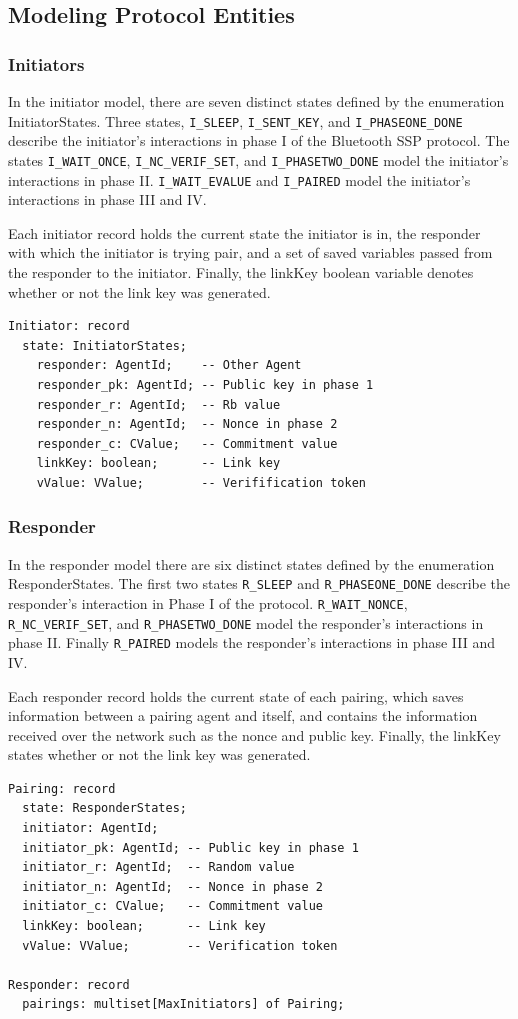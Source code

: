 \documentclass{acm_proc_article-sp}
\begin{document}
\subsection{Modeling Protocol Entities}

\subsubsection{Initiators}
In the initiator model, there are seven distinct states defined by the enumeration InitiatorStates. Three states, \texttt{I\_SLEEP}, \texttt{I\_SENT\_KEY}, and \texttt{I\_PHASEONE\_DONE} describe the initiator's interactions in phase I of the Bluetooth SSP protocol. The states \texttt{I\_WAIT\_ONCE}, \texttt{I\_NC\_VERIF\_SET}, and \texttt{I\_PHASETWO\_DONE} model the initiator's interactions in phase II. \texttt{I\_WAIT\_EVALUE} and \texttt{I\_PAIRED} model the initiator's interactions in phase III and IV.

Each initiator record holds the current state the initiator is in, the responder with which the initiator is trying pair, and a set of saved variables passed from the responder to the initiator. Finally, the linkKey boolean variable denotes whether or not the link key was generated.
\begin{verbatim}
Initiator: record
  state: InitiatorStates;
    responder: AgentId;    -- Other Agent
    responder_pk: AgentId; -- Public key in phase 1
    responder_r: AgentId;  -- Rb value
    responder_n: AgentId;  -- Nonce in phase 2
    responder_c: CValue;   -- Commitment value
    linkKey: boolean;      -- Link key
    vValue: VValue;        -- Verifification token
\end{verbatim}

\subsubsection{Responder}
In the responder model there are six distinct states defined by the enumeration ResponderStates. The first two states \texttt{R\_SLEEP} and \texttt{R\_PHASEONE\_DONE} describe the responder's interaction in Phase I of the protocol. \texttt{R\_WAIT\_NONCE}, \texttt{R\_NC\_VERIF\_SET}, and \texttt{R\_PHASETWO\_DONE} model the responder's interactions in phase II. Finally \texttt{R\_PAIRED} models the responder's interactions in phase III and IV.

Each responder record holds the current state of each pairing, which saves information between a pairing agent and itself, and contains the information received over the network such as the nonce and public key. Finally, the linkKey states whether or not the link key was generated.
\begin{verbatim}
Pairing: record
  state: ResponderStates;
  initiator: AgentId;
  initiator_pk: AgentId; -- Public key in phase 1
  initiator_r: AgentId;  -- Random value
  initiator_n: AgentId;  -- Nonce in phase 2
  initiator_c: CValue;   -- Commitment value
  linkKey: boolean;      -- Link key
  vValue: VValue;        -- Verification token
  
Responder: record
  pairings: multiset[MaxInitiators] of Pairing;
\end{verbatim}
\end{document}
